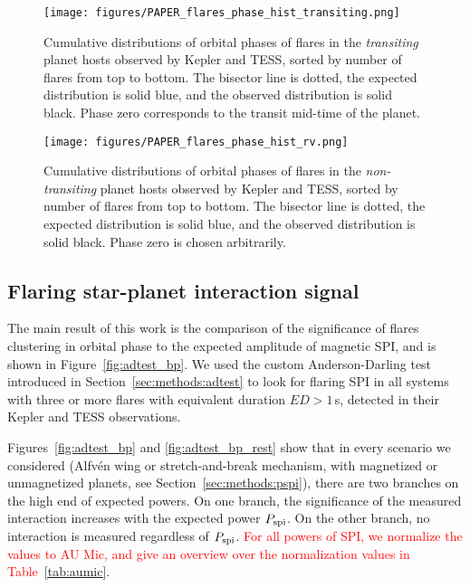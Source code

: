 \documentclass[twocolumn]{aastex631}
\begin{document}
\begin{figure*}[ht!]
    \begin{centering}
        \texttt{[image: figures/PAPER\_flares\_phase\_hist\_transiting.png]}
        \caption{
            Cumulative distributions of orbital phases of flares in the \textit{transiting} planet hosts observed by Kepler and TESS, sorted by number of flares from top to bottom. The bisector line is dotted, the expected distribution is solid blue, and the observed distribution is solid black. Phase zero corresponds to the transit mid-time of the planet. 
        }
        \label{fig:cumdist_transiting}
    \end{centering}
\end{figure*}

\begin{figure*}[ht!]
    \begin{centering}
        \texttt{[image: figures/PAPER\_flares\_phase\_hist\_rv.png]}
        \caption{
            Cumulative distributions of orbital phases of flares in the \textit{non-transiting} planet hosts observed by Kepler and TESS, sorted by number of flares from top to bottom. The bisector line is dotted, the expected distribution is solid blue, and the observed distribution is solid black. Phase zero is chosen arbitrarily. 
        }
        \label{fig:cumdist_rv}
    \end{centering}
\end{figure*}

\subsection{Flaring star-planet interaction signal}
\label{sec:results:spi}
The main result of this work is the comparison of the significance of flares clustering in orbital phase to the expected amplitude of magnetic SPI, and is shown in Figure~\ref{fig:adtest_bp}. We used the custom Anderson-Darling test introduced in Section~\ref{sec:methods:adtest} to look for flaring SPI in all systems with three or more flares with equivalent duration $ED>1\,$s, detected in their Kepler and TESS observations. 

Figures~\ref{fig:adtest_bp} and \ref{fig:adtest_bp_rest} show that in every scenario we considered (Alfv\'en wing or stretch-and-break mechanism, with magnetized or unmagnetized planets, see Section~\ref{sec:methods:pspi}), there are two branches on the high end of expected powers. On one branch, the significance of the measured interaction increases with the expected power $P_{\rm spi}$. On the other branch, no interaction is measured regardless of $P_{\rm spi}$. \textcolor{red}{For all powers of SPI, we normalize the values to AU Mic, and give an overview over the normalization values in Table~\ref{tab:aumic}}.
\end{document}
